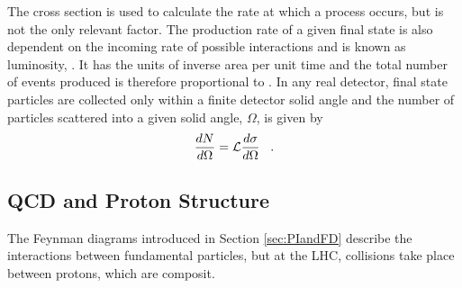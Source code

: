  The cross section is used to calculate the rate
  at which a process occurs, but is
  not the only relevant factor.
 The production rate of a given final state
  is also dependent on the incoming
  rate of possible interactions and is 
  known as luminosity, \lumi.
 It has the units of inverse area per unit time
  and the total number of events produced
  is therefore proportional to \tlumi.
 In any real detector, final state particles
  are collected only within a finite detector
  solid angle and the number of particles
  scattered into a given solid angle, $\Omega$, is given by
\begin{equation}
 \frac{dN}{d\Omega} = \mathcal L \frac{d\sigma}{d\Omega}\;\;\;.
\end{equation}






 
\subsection{QCD and Proton Structure}
 The Feynman diagrams introduced in Section \ref{sec:PIandFD}
  describe the interactions between fundamental particles,
  but at the LHC, collisions take place between
  protons, which are composit.

